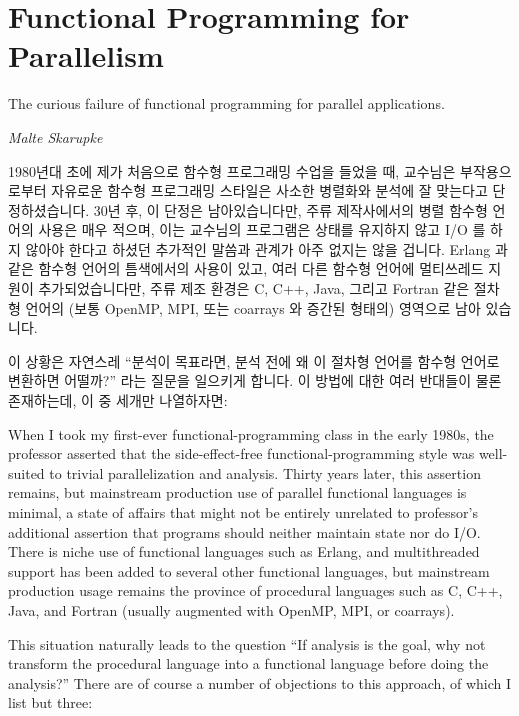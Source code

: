 
\section{Functional Programming for Parallelism}
\label{sec:future:Functional Programming for Parallelism}
%
\epigraph{The curious failure of functional programming for parallel
	  applications.}
	 {\emph{Malte Skarupke}}

1980년대 초에 제가 처음으로 함수형 프로그래밍 수업을 들었을 때, 교수님은
부작용으로부터 자유로운 함수형 프로그래밍 스타일은 사소한 병렬화와 분석에 잘
맞는다고 단정하셨습니다.
30년 후, 이 단정은 남아있습니다만, 주류 제작사에서의 병렬 함수형 언어의 사용은
매우 적으며, 이는 교수님의 프로그램은 상태를 유지하지 않고 I/O 를 하지 않아야
한다고 하셨던 추가적인 말씀과 관계가 아주 없지는 않을 겁니다.
Erlang 과 같은 함수형 언어의 틈색에서의 사용이 있고, 여러 다른 함수형 언어에
멀티쓰레드 지원이 추가되었습니다만, 주류 제조 환경은 C, C++, Java, 그리고
Fortran 같은 절차형 언어의 (보통 OpenMP, MPI, 또는 coarrays 와 증간된 형태의)
영역으로 남아 있습니다.

이 상황은 자연스레 ``분석이 목표라면, 분석 전에 왜 이 절차형 언어를 함수형
언어로 변환하면 어떨까?'' 라는 질문을 일으키게 합니다.
이 방법에 대한 여러 반대들이 물론 존재하는데, 이 중 세개만 나열하자면:

\iffalse

When I took my first-ever functional-programming class in the early 1980s,
the professor asserted that the side-effect-free functional-programming
style was well-suited to trivial parallelization and analysis.
Thirty years later, this assertion remains, but mainstream production
use of parallel functional languages is minimal, a state of affairs that
might not be entirely unrelated to professor's additional
assertion that programs should neither maintain state nor do I/O\@.
There is niche use of functional languages such as Erlang, and
multithreaded support has been added to several other functional languages,
but mainstream production usage remains the province of procedural
languages such as C, C++, Java, and Fortran (usually augmented with
OpenMP, MPI, or coarrays).

This situation naturally leads to the question ``If analysis is the goal,
why not transform the procedural language into a functional language before
doing the analysis?''
There are of course a number of objections to this approach, of which
I list but three:

